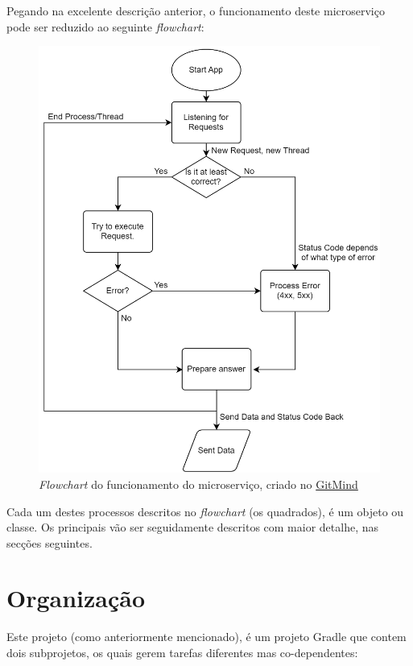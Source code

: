 Pegando na excelente descrição anterior, o funcionamento deste microserviço pode ser reduzido ao seguinte \textit{flowchart}:

\begin{figure}[!hbt]
        \centering
        \includegraphics[width=14cm]{figuras/flowchart1.png}
        \caption{\textit{Flowchart} do funcionamento do microserviço, criado no \href{https://gitmind.com/app/flowchart/ccd11723910}{GitMind}}
        \label{fig:flow1}
\end{figure}
\FloatBarrier

Cada um destes processos descritos no \textit{flowchart} (os quadrados), é um objeto ou classe. Os principais vão ser seguidamente descritos com maior detalhe, nas secções seguintes.

\newpage

\section{Organização}

Este projeto (como anteriormente mencionado), é um projeto Gradle que contem dois subprojetos, os quais gerem tarefas diferentes mas co-dependentes:

